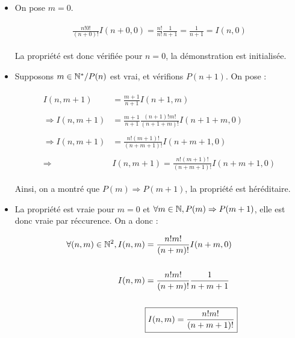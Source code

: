 \documentclass{article}
\begin{document}
\begin{itemize}
\item On pose $m=0$.

\begin{align}
\begin{split}
\frac{n!0!}{(n+0)!}I(n+0, 0)=\frac{n!}{n!}\frac{1}{n+1}=\frac{1}{n+1}=I(n, 0)
\end{split}
\end{align}

La propriété est donc vérifiée pour $n=0$, la démonstration est initialisée.

\bigskip
\bigskip
\bigskip

\item Supposons $m\in\mathbb{N}^*/P(n)$ est vrai, et vérifions $P(n+1)$. On pose :

\begin{align}
\begin{split}
I(n, m+1)&=\frac{m+1}{n+1}I(n+1, m)\\\\
\Longrightarrow I(n, m+1)&=\frac{m+1}{n+1}\frac{(n+1)!m!}{(n+1+m)!}I(n+1+m, 0)\\\\
\Longrightarrow I(n, m+1)&=\frac{n!(m+1)!}{(n+m+1)!}I(n+m+1, 0)\\\\
\Longrightarrow &\boxed{I(n, m+1)=\frac{n!(m+1)!}{(n+m+1)!}I(n+m+1, 0)}
\end{split}
\end{align}

Ainsi, on a montré que $P(m)\Rightarrow P(m+1)$, la propriété est héréditaire.

\bigskip
\bigskip
\bigskip

\item La propriété est vraie pour $m=0$ et $\forall m\in\mathbb{N}, P(m)\Rightarrow P(m+1)$, elle est donc vraie par réccurence. On a donc :

\end{itemize}

\begin{equation}
\begin{split}
\forall (n, m)\in\mathbb{N}^2, I(n, m)&=\frac{n!m!}{(n+m)!}I(n+m, 0)\\\\
I(n, m) &= \frac{n!m!}{(n+m)!}\frac{1}{n+m+1}\\\\
&\boxed{I(n, m) = \frac{n!m!}{(n+m+1)!}}
\end{split}
\end{equation}    
\end{document}
